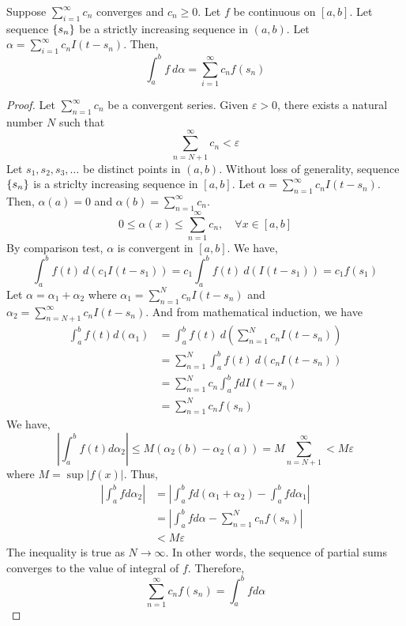 \begin{theorem}
	Suppose $\displaystyle \sum_{i=1}^\infty c_n$ converges and $c_n \ge 0$.
	Let $f$ be continuous on $[a,b]$.
	Let sequence $\left\{s_n\right\}$ be a strictly increasing sequence in $(a,b)$.
	Let $\displaystyle \alpha = \sum_{i=1}^\infty c_n I(t-s_n)$.
	Then,
	\[ \int_a^b f\ d\alpha = \sum_{i=1}^\infty c_n f(s_n) \]
\end{theorem}
\begin{proof}
	Let $\sum_{n=1}^\infty c_n$ be a convergent series.
	Given $\varepsilon > 0$, there exists a natural number $N$ such that 
	\[ \sum_{n=N+1}^\infty c_n < \varepsilon \]
	Let $s_1,s_2,s_3,\dotsc$ be distinct points in $(a,b)$.
	Without loss of generality, sequence $\left\{s_n\right\}$ is a striclty increasing sequence in $[a,b]$.
	Let $\alpha = \sum_{n = 1}^\infty c_n I(t-s_n)$.
	Then, $\alpha(a) = 0$ and $\alpha(b) = \sum_{n=1}^\infty c_n$.
	\[ 0 \le \alpha(x) \le \sum_{n=1}^\infty c_n, \quad \forall x \in [a,b] \]
	By comparison test, $\alpha$ is convergent in $[a,b]$.
	We have,
	\[ \int_a^b f(t)\ d(c_1 I(t-s_1)) = c_1 \int_a^b f(t)\ d(I(t-s_1)) =  c_1 f(s_1) \]
	Let $\alpha = \alpha_1 + \alpha_2$ where $\displaystyle \alpha_1 = \sum_{n=1}^N c_n I(t-s_n)$ and $\displaystyle\alpha_2 = \sum_{n=N+1}^\infty c_n I(t-s_n)$.
	And from mathematical induction, we have
	\begin{align*}
	\int_a^b f(t) d(\alpha_1) 
		& = \int_a^b f(t)\ d\left( \sum_{n=1}^N c_n I(t-s_n) \right)\\
		& = \sum_{n=1}^N \int_a^b f(t)\ d(c_nI(t-s_n)) \\
		& = \sum_{n=1}^N c_n \int_a^b f dI(t-s_n) \\
		& = \sum_{n=1}^N c_n f(s_n) 
	\end{align*}
	We have,
	\[ \left| \int_a^b f(t) d\alpha_2 \right| \le M (\alpha_2(b) - \alpha_2(a)) = M \sum_{n=N+1}^\infty < M\varepsilon \]
	where $M = \sup |f(x)|$.
	Thus,
	\begin{align*}
	\left| \int_a^b fd\alpha_2 \right| 
		& = \left| \int_a^b f d(\alpha_1+\alpha_2) - \int_a^b fd\alpha_1 \right| \\
		& = \left| \int_a^b fd\alpha - \sum_{n=1}^N c_n f(s_n) \right| \\
		& < M\varepsilon 
	\end{align*}
	The inequality is true as $N \to \infty$. 
	In other words, the sequence of partial sums converges to the value of integral of $f$.
	Therefore,
	\[ \sum_{n=1}^\infty c_n f(s_n) = \int_a^b f d\alpha \]
\end{proof}


